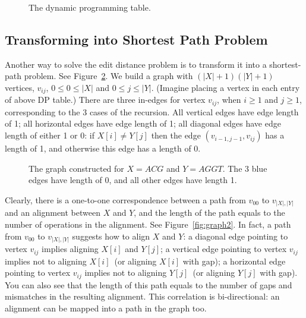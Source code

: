 \begin{figure}[h]
\centering{}
\caption{The dynamic programming table.}
\label{fig:table}
\end{figure}


\begin{minipage}{0.8\textwidth}
	\xxx
	\xxx
	\xxx
	\xxx
	\xxx
	\xxx
	\xxx
	\xxx
	\xxx
	\xxx
\end{minipage}

\subsection*{Transforming into Shortest Path Problem}

Another way to solve the edit distance problem is to transform it into a shortest-path problem.
See Figure~\ref{fig:graph}.
We build a graph with $(|X| + 1)(|Y| + 1)$ vertices, $v_{ij}$, $0\le 0 \le |X|$ and $0\le j \le |Y|$. 
(Imagine placing a vertex in each entry of above DP table.)
There are three in-edges for vertex $v_{ij}$, when $i\ge 1$ and $j \ge 1$, corresponding to
the 3 cases of the recursion. 
All vertical edges have edge length of 1;
all horizontal edges have edge length of 1;
all diagonal edges have edge length of either 1 or 0: 
if $X[i] \neq Y[j]$ then the edge $(v_{i-1,j-1}, v_{ij})$ has a length of 1,
and otherwise this edge has a length of 0.

\begin{figure}[h]
\centering{}
\caption{The graph constructed for $X=ACG$ and $Y = AGGT$. The 3 blue edges have length of 0, and all other edges have length 1.}
\label{fig:graph}
\end{figure}

Clearly, there is a one-to-one correspondence between a path from $v_{00}$ to $v_{|X|,|Y|}$
and an alignment between $X$ and $Y$, and the length of the path equals to the
number of operations in the alignment. 
See Figure~\ref{fig:graph2}.
In fact, a path from $v_{00}$ to $v_{|X|,|Y|}$
suggests how to align $X$ and $Y$: a diagonal edge pointing to vertex $v_{ij}$ implies aligning $X[i]$ and $Y[j]$;
a vertical edge pointing to vertex $v_{ij}$ implies not to aligning $X[i]$~(or aligning $X[i]$ with gap);
a horizontal edge pointing to vertex $v_{ij}$ implies not to aligning $Y[j]$~(or aligning $Y[j]$ with gap).
You can also see that the length of this path equals to the number of 
gaps and mismatches in the resulting alignment. This correlation is bi-directional:
an alignment can be mapped into a path in the graph too.


